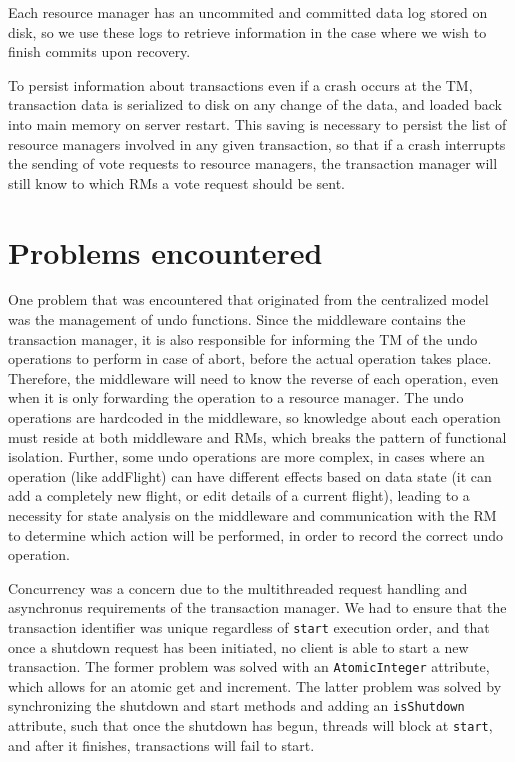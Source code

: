 \documentclass[11pt]{article}
\begin{document}
Each resource manager has an uncommited and committed data log stored on disk, so we use these logs to retrieve information in the case where we wish to finish commits upon recovery.\par

To persist information about transactions even if a crash occurs at the TM, transaction data is serialized to disk on any change of the data, and loaded back into main memory on server restart. This saving is necessary to persist the list of resource managers involved in any given transaction, so that if a crash interrupts the sending of vote requests to resource managers, the transaction manager will still know to which RMs a vote request should be sent.

\section*{Problems encountered}

One problem that was encountered that originated from the centralized model was the management of undo functions. Since the middleware contains the transaction manager, it is also responsible for informing the TM of the undo operations to perform in case of abort, before the actual operation takes place. Therefore, the middleware will need to know the reverse of each operation, even when it is only forwarding the operation to a resource manager. The undo operations are hardcoded in the middleware, so knowledge about each operation must reside at both middleware and RMs, which breaks the pattern of functional isolation. Further, some undo operations are more complex, in cases where an operation (like addFlight) can have different effects based on data state (it can add a completely new flight, or edit details of a current flight), leading to a necessity for state analysis on the middleware and communication with the RM to determine which action will be performed, in order to record the correct undo operation. \par

Concurrency was a concern due to the multithreaded request handling and asynchronus requirements of the transaction manager. We had to ensure that the transaction identifier was unique regardless of \texttt{start} execution order, and that once a shutdown request has been initiated, no client is able to start a new transaction. The former problem was solved with an \texttt{AtomicInteger} attribute, which allows for an atomic get and increment. The latter problem was solved by synchronizing the shutdown and start methods and adding an \texttt{isShutdown} attribute, such that once the shutdown has begun, threads will block at \texttt{start}, and after it finishes, transactions will fail to start. \par
\end{document}
